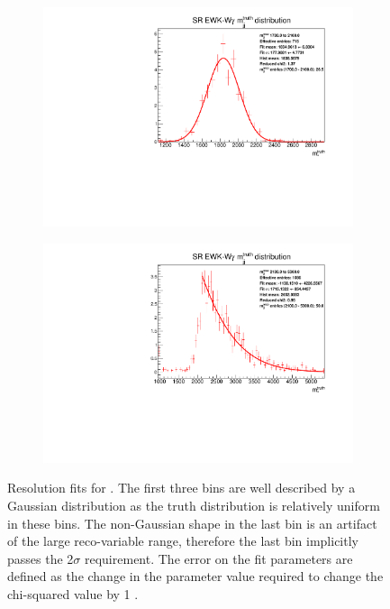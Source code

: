 \begin{figure}[t]
\begin{subfigure}[b]{0.48\textwidth}
    \includegraphics[width=\textwidth]{plots/diffx/binning/Gaussians/jj_m_bin3_SR.pdf}
    \caption{}
\end{subfigure}
\hfill
\begin{subfigure}[b]{0.48\textwidth}
    \centering
    \includegraphics[width=\textwidth]{plots/diffx/binning/Gaussians/jj_m_bin4_SR.pdf}
    \caption{}
\end{subfigure}
\caption{Resolution fits for \mjj. The first three bins are well described by a Gaussian distribution as the truth distribution is relatively uniform in these bins. The non-Gaussian shape in the last bin is an artifact of the large reco-variable range, therefore the last bin implicitly passes the 2$\sigma$ requirement. The error on the fit parameters are defined as the change in the parameter value required to change the chi-squared value by 1 \cite{VBSWy:minuit}.\label{fig:vbswy:resolutionmjj}}
\end{figure}

